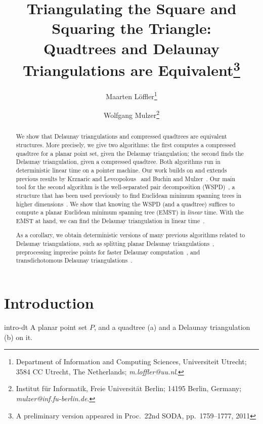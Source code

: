 \documentclass[11pt]{paper}
\title{\Large Triangulating the Square and Squaring the Triangle:\\ 
Quadtrees and Delaunay 
Triangulations are Equivalent\footnote{A preliminary version 
appeared in Proc.~22nd SODA, pp.~1759--1777, 2011}}
\author{Maarten L\"offler\thanks{Department of Information and Computing Sciences,
   Universiteit Utrecht;
   3584 CC Utrecht,
   The Netherlands;
   \textsl{m.loffler@uu.nl}.
  }
\and
Wolfgang Mulzer\thanks{Institut f{\"u}r Informatik,
  Freie Universit{\"a}t Berlin; 14195 Berlin, Germany;
  \textsl{mulzer@inf.fu-berlin.de}.
      }
}
\date{}
\begin{document}
\maketitle



\begin{abstract}
  We show that Delaunay triangulations and compressed quadtrees are equivalent
  structures. More precisely, we give two algorithms: the first computes
  a compressed quadtree for a planar point set, given the Delaunay
  triangulation; the second finds the Delaunay triangulation, given a
  compressed quadtree. Both algorithms run in deterministic linear time on
  a pointer machine.
  Our work builds on and extends previous
  results by Krznaric and Levcopolous~\cite{KrznaricLe98} and
  Buchin and Mulzer~\cite{BuchinMu11}. Our main tool for the second 
  algorithm is the
  well-separated pair decomposition (WSPD)~\cite{CallahanKo95},
  a structure that has been used previously to find Euclidean minimum
  spanning trees in higher dimensions~\cite{Eppstein00}. We show that knowing
  the WSPD (and a quadtree) suffices to compute
  a planar Euclidean minimum spanning tree (EMST) in \emph{linear} time. 
  With the EMST
  at hand, we can find the Delaunay triangulation in
  linear time~\cite{ChinWa99}.

  As a corollary, we obtain
  deterministic versions of many previous algorithms related
  to Delaunay triangulations, such as
  splitting planar Delaunay
  triangulations~\cite{ChazelleDeHuMoSaTe02,ChazelleMu11},
  preprocessing imprecise points for faster Delaunay
  computation~\cite{BuchinLoMoMuXX,LoefflerSn10}, and transdichotomous
  Delaunay triangulations~\cite{BuchinMu11,ChanPa09,ChanPa10}.
\end{abstract}

\section {Introduction}

   {intro-dt} {A planar point set $P$, and a quadtree (a) and a Delaunay triangulation (b) on it.}
\end{document}
